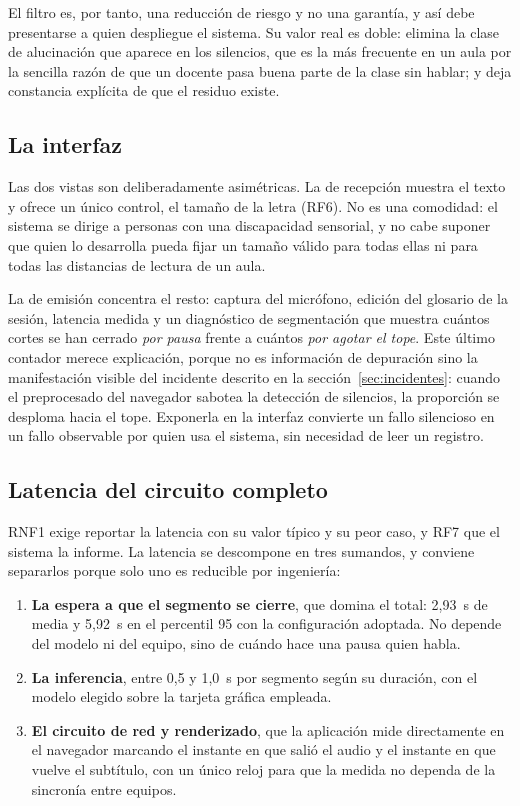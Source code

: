 El filtro es, por tanto, una reducción de riesgo y no una garantía, y así debe presentarse a
quien despliegue el sistema. Su valor real es doble: elimina la clase de alucinación que
aparece en los silencios, que es la más frecuente en un aula por la sencilla razón de que un
docente pasa buena parte de la clase sin hablar; y deja constancia explícita de que el
residuo existe.

\subsection{La interfaz}

Las dos vistas son deliberadamente asimétricas. La de recepción muestra el texto y ofrece un
único control, el tamaño de la letra (RF6). No es una comodidad: el sistema se dirige a
personas con una discapacidad sensorial, y no cabe suponer que quien lo desarrolla pueda
fijar un tamaño válido para todas ellas ni para todas las distancias de lectura de un aula.

La de emisión concentra el resto: captura del micrófono, edición del glosario de la sesión,
latencia medida y un diagnóstico de segmentación que muestra cuántos cortes se han cerrado
\emph{por pausa} frente a cuántos \emph{por agotar el tope}. Este último contador merece
explicación, porque no es información de depuración sino la manifestación visible del
incidente descrito en la sección~\ref{sec:incidentes}: cuando el preprocesado del navegador
sabotea la detección de silencios, la proporción se desploma hacia el tope. Exponerla en la
interfaz convierte un fallo silencioso en un fallo observable por quien usa el sistema, sin
necesidad de leer un registro.

\subsection{Latencia del circuito completo}
\label{sec:latencia}

RNF1 exige reportar la latencia con su valor típico y su peor caso, y RF7 que el sistema la
informe. La latencia se descompone en tres sumandos, y conviene separarlos porque solo uno
es reducible por ingeniería:

\begin{enumerate}
  \item \textbf{La espera a que el segmento se cierre}, que domina el total: 2,93~s de media
        y 5,92~s en el percentil 95 con la configuración adoptada. No depende del modelo ni
        del equipo, sino de cuándo hace una pausa quien habla.
  \item \textbf{La inferencia}, entre 0,5 y 1,0~s por segmento según su duración, con el
        modelo elegido sobre la tarjeta gráfica empleada.
  \item \textbf{El circuito de red y renderizado}, que la aplicación mide directamente en el
        navegador marcando el instante en que salió el audio y el instante en que vuelve el
        subtítulo, con un único reloj para que la medida no dependa de la sincronía entre
        equipos.
\end{enumerate}

